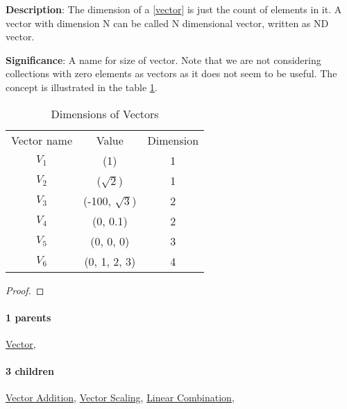 \documentclass[../main.tex]{subfiles}
\begin{document}
\begin{statement}
\label{statement:Vector Dimension}\hspace*{0pt}\par
\end{statement}
\textbf{Description}:
  The dimension of a [\hyperref[statement:Vector]{vector}] is just the count of elements in it.
  A vector with dimension N can be called N dimensional vector, written as ND vector.
\par
{\color{magenta} \textbf{Significance}:
  A name for size of vector.
  Note that we are not considering collections with zero elements as vectors as it does not seem to be useful.
  The concept is illustrated in the table \ref{tab:dim}.
  \begin{table}[ht]
    \centering
    \begin{tabular}{ c  c  c }
      Vector name & Value & Dimension\\
      $ V_1 $ & (1) & 1\\
      $ V_2 $ & ($\sqrt{2}$) & 1\\
      $ V_3 $ & (-100, $\sqrt{3}$) & 2\\
      $ V_4 $ & (0, 0.1) & 2\\
      $ V_5 $ & (0, 0, 0) & 3\\
      $ V_6 $ & (0, 1, 2, 3) & 4\\
    \end{tabular}
  \caption{Dimensions of Vectors}
  \label{tab:dim}
  \end{table}
\par}
\begin{proof}
\proofbydefinition
\end{proof}\par
\paragraph{1 parents} \hyperref[statement:Vector]{Vector}, 
\paragraph{3 children} \hyperref[statement:Vector Addition]{Vector Addition}, \hyperref[statement:Vector Scaling]{Vector Scaling}, \hyperref[statement:Linear Combination]{Linear Combination}, 
\end{document}
